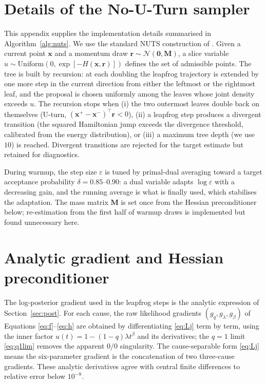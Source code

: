 \documentclass[ASNA,twocolumn]{USG}
\begin{document}
\appendix
\section{Details of the No-U-Turn sampler}\label{app:nuts}
This appendix supplies the implementation details summarised in
Algorithm~\ref{alg:nuts}. We use the standard NUTS construction of
\cite{hoffman2014nuts,carpenter2017stan}. Given a current point
$\bm x$ and a momentum draw $\bm r\sim\mathcal N(\bm0,\bm M)$, a slice
variable $u\sim\mathrm{Uniform}(0,\exp[-H(\bm x,\bm r)])$ defines the set
of admissible points. The tree is built by recursion: at each doubling the
leapfrog trajectory is extended by one more step in the current direction
from either the leftmost or the rightmost leaf, and the proposal is chosen
uniformly among the leaves whose joint density exceeds $u$. The recursion
stops when (i) the two outermost leaves double back on themselves
(U-turn, $(\bm x^{+}-\bm x^{-})^{\top}\bm r<0$), (ii) a leapfrog step
produces a divergent transition (the squared Hamiltonian jump exceeds the
divergence threshold, calibrated from the energy distribution), or (iii) a
maximum tree depth (we use $10$) is reached. Divergent transitions are
rejected for the target estimate but retained for diagnostics.

During warmup, the step size $\varepsilon$ is tuned by primal-dual
averaging \cite{hoffman2014nuts} toward a target acceptance probability
$\delta=0.85$--$0.90$: a dual variable adapts $\log\varepsilon$ with a
decreasing gain, and the running average is what is finally used, which
stabilises the adaptation. The mass matrix $\bm M$ is set once from the
Hessian preconditioner below; re-estimation from the first half of warmup
draws is implemented but found unnecessary here.

\section{Analytic gradient and Hessian preconditioner}\label{app:hess}
The log-posterior gradient used in the leapfrog steps is the analytic
expression of Section~\ref{sec:post}. For each cause, the raw likelihood
gradients $(g_q,g_\lambda,g_\beta)$ of Equations \eqref{eq:f}--\eqref{eq:h}
are obtained by differentiating \eqref{eq:Lj} term by term, using the
inner factor $u(t)=1-(1-q)\lambda t^\beta$ and its derivatives; the
$q=1$ limit \eqref{eq:q1lim} removes the apparent $0/0$ singularity. The
cause-separable form \eqref{eq:Lj} means the six-parameter gradient is the
concatenation of two three-cause gradients. These analytic derivatives agree
with central finite differences to relative error below $10^{-8}$.
\end{document}

